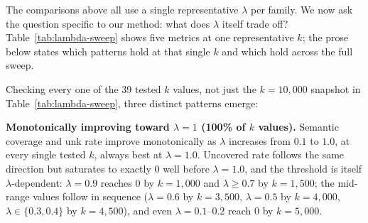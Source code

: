 The comparisons above all use a single representative $\lambda$ per family.
We now ask the question specific to our method: what does $\lambda$ itself
trade off? Table~\ref{tab:lambda-sweep} shows five metrics at one
representative $k$; the prose below states which patterns hold at that
single $k$ and which hold across the full sweep.
\begin{table}[h]
\centering
{}
\caption{Effect of $\lambda$ on five metrics at $k=10{,}000$ (representative
of the pattern at every $k$ we checked -- see prose for how consistently
each pattern holds across the full $k=500$--$19{,}500$ range). $^\ast\lambda=0$'s
conciseness is not bolded despite being numerically lowest: it is an
artifact of the same kind flagged for $k$-random in
Section~\ref{sec:results:candidates} -- the average is taken over the tiny
sliver of trivially exact-matched concepts $\lambda=0$ actually covers, not
a genuine efficiency gain (see discussion below).}
\label{tab:lambda-sweep}
\end{table}
Checking every one of the 39 tested $k$ values, not just the $k=10{,}000$
snapshot in Table~\ref{tab:lambda-sweep}, three distinct patterns emerge:

\textbf{Monotonically improving toward $\lambda=1$ (100\% of $k$ values).}
Semantic coverage and unk rate improve monotonically as $\lambda$ increases
from $0.1$ to $1.0$, at every single tested $k$, always best at
$\lambda=1.0$. Uncovered rate follows the same direction but saturates to
exactly $0$ well before $\lambda=1.0$, and the threshold is itself
$\lambda$-dependent: $\lambda=0.9$ reaches $0$ by $k=1{,}000$ and
$\lambda\ge0.7$ by $k=1{,}500$; the mid-range values follow in sequence
($\lambda=0.6$ by $k=3{,}500$, $\lambda=0.5$ by $k=4{,}000$,
$\lambda\in\{0.3,0.4\}$ by $k=4{,}500$), and even $\lambda=0.1$--$0.2$ reach
$0$ by $k=5{,}000$.

